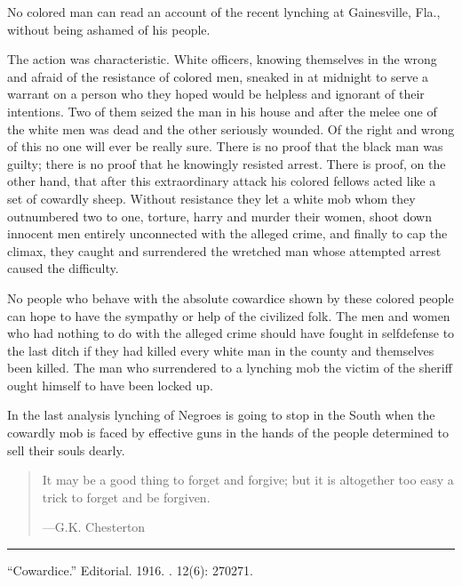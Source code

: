 \documentclass[letterpaper,10pt,english]{jupyterBook}
\begin{document}
\sphinxAtStartPar
No colored man can read an account of the recent lynching at Gainesville, Fla., without being ashamed of his people.

\sphinxAtStartPar
The action was characteristic. White officers, knowing themselves in the wrong and afraid of the resistance of colored men, sneaked in at midnight to serve a warrant on a person who they hoped would be helpless and ignorant of their intentions. Two of them seized the man in his house and after the melee one of the white men was dead and the other seriously wounded. Of the right and wrong of this no one will ever be really sure. There is no proof that the black man was guilty; there is no proof that he knowingly resisted arrest. There is proof, on the other hand, that after this extraordinary attack his colored fellows acted like a set of cowardly sheep. Without resistance they let a white mob whom they outnumbered two to one, torture, harry and murder their women, shoot down innocent men entirely unconnected with the alleged crime, and finally to cap the climax, they caught and surrendered the wretched man whose attempted arrest caused the difficulty.

\sphinxAtStartPar
No people who behave with the absolute cowardice shown by these colored people can hope to have the sympathy or help of the civilized folk. The men and women who had nothing to do with the alleged crime should have fought in self\sphinxhyphen{}defense to the last ditch if they had killed every white man in the county and themselves been killed. The man who surrendered to a lynching mob the victim of the sheriff ought himself to have been locked up.

\sphinxAtStartPar
In the last analysis lynching of Negroes is going to stop in the South when the cowardly mob is faced by effective guns in the hands of the people determined to sell their souls dearly.
\begin{quote}

\sphinxAtStartPar
It may be a good thing to forget and forgive; but it is altogether too easy a trick to forget and be forgiven.

\begin{flushright}
---G.K. Chesterton
\end{flushright}
\end{quote}


\bigskip\hrule\bigskip


\sphinxAtStartPar
{} “Cowardice.” Editorial. 1916. . 12(6): 270\sphinxhyphen{}271.
\end{document}
